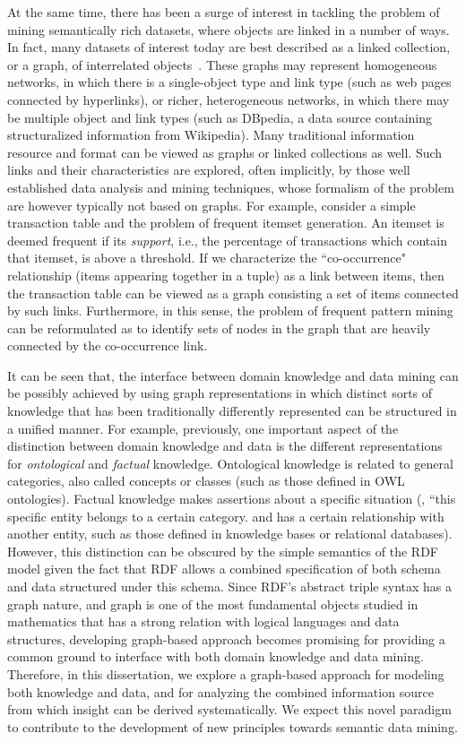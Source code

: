 At the same time, there has been a surge of interest in tackling the problem of mining semantically rich datasets, where objects are linked in a number of ways. In fact, many datasets of interest today are best described as a linked collection, or a graph, of interrelated objects~\cite{LinkMiningGetoor}. These graphs may represent homogeneous networks, in which there is a single-object type and link type (such as web pages connected by hyperlinks), or richer, heterogeneous networks, in which there may be multiple object and link types (such as DBpedia, a data source containing structuralized information from Wikipedia). Many traditional information resource and format can be viewed as graphs or linked collections as well. Such links and their characteristics are explored, often implicitly, by those well established data analysis and mining techniques, whose formalism of the problem are however typically not based on graphs. For example, consider a simple transaction table and the problem of frequent itemset generation. An itemset is deemed frequent if its \emph{support}, i.e., the percentage of transactions which contain that itemset, is above a threshold. If we characterize the ``co-occurrence" relationship (items appearing together in a tuple) as a link between items, then the transaction table can be viewed as a graph consisting a set of items connected by such links. Furthermore, in this sense, the problem of frequent pattern mining can be reformulated as to identify sets of nodes in the graph that are heavily connected by the co-occurrence link. 

It can be seen that, the interface between domain knowledge and data mining can be possibly achieved by using graph representations in which distinct sorts of knowledge that has been traditionally differently represented can be structured in a unified manner. For example, previously, one important aspect of the distinction between domain knowledge and data is the different representations for \emph{ontological} and \emph{factual} knowledge. Ontological knowledge is related to general categories, also called concepts or classes (such as those defined in OWL ontologies). Factual knowledge makes assertions about a specific situation (\eg, ``this specific entity belongs to a certain category. and has a certain relationship with another entity, such as those defined in knowledge bases or relational databases). However, this distinction can be obscured by the simple semantics of the RDF model given the fact that RDF allows a combined specification of both schema and data structured under this schema. Since RDF's abstract triple syntax has a graph nature, and graph is one of the most fundamental objects studied in mathematics that has a strong relation with logical languages and data structures, developing graph-based approach becomes promising for providing a common ground to interface with both domain knowledge and data mining. Therefore, in this dissertation, we explore a graph-based approach for modeling both knowledge and data, and for analyzing the combined information source from which insight can be derived systematically. We expect this novel paradigm to contribute to the development of new principles towards semantic data mining.

